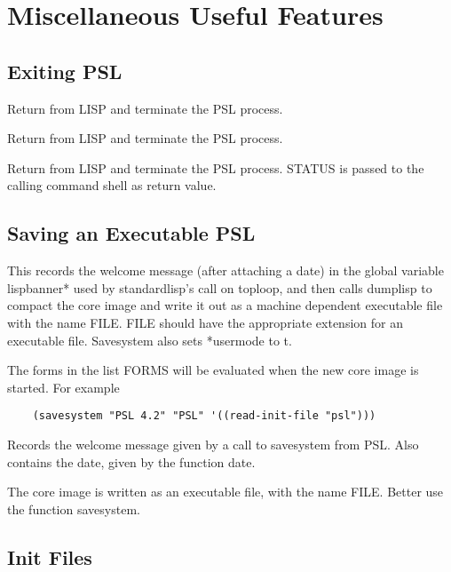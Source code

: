 \chapter*{Miscellaneous Useful Features}

\section{Exiting PSL}

{    Return  from  LISP  and  terminate  the PSL process.  }

{  Return  from  LISP  and  terminate  the PSL process.  }

{  Return  from  LISP  and  terminate  the PSL process.
   STATUS is passed to the calling command shell as return value.  }

\section{Saving an Executable PSL}

 {    
    This records the welcome message (after attaching a date) in
    the  global variable lispbanner* used by standardlisp's call
    on toploop, and then calls  dumplisp  to  compact  the  core
    image  and  write  it  out as a machine dependent executable
    file with the name FILE.  FILE should have  the  appropriate
    extension  for  an  executable  file.   Savesystem also sets
    *usermode to t.
}

    The forms in the list FORMS will be evaluated when  the  new
    core image is started.  For example

\begin{verbatim}
    (savesystem "PSL 4.2" "PSL" '((read-init-file "psl")))
\end{verbatim}
{
    Records  the  welcome  message given by a call to savesystem
    from PSL.  Also contains  the date, given  by  the  function
    date.  }

{    The  core  image  is written as an executable file, with the
    name FILE. Better use the function savesystem.
}
\section{Init Files}

